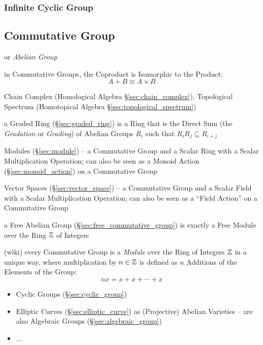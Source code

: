 \subsubsection{Infinite Cyclic Group}\label{sec:infinite_cyclic}



\subsection{Commutative Group}\label{sec:commutative_group}

or \emph{Abelian Group}

in Commutative Groups, the Coproduct is Isomorphic to the Product:
\[
  A + B \cong A \times B
\]

\fist Chain Complex (Homological Algebra \S\ref{sec:chain_complex}), Topological
Spectrum (Homotopical Algebra \S\ref{sec:topological_spectrum})

\fist a Graded Ring (\S\ref{sec:graded_ring}) is a Ring that is the Direct Sum
(the \emph{Gradation} or \emph{Grading}) of Abelian Groups $R_i$ such that
$R_iR_j \subseteq R_{i+j}$

\fist Modules (\S\ref{sec:module}) -- a Commutative Group and a Scalar Ring with
a Scalar Multiplication Operation; can also be seen as a Monoid Action
(\S\ref{sec:monoid_action}) on a Commutative Group

\fist Vector Spaces (\S\ref{sec:vector_space}) -- a Commutative Group and a
Scalar Field with a Scalar Multiplication Operation; can also be seen as a
``Field Action'' on a Commutative Group

\fist a Free Abelian Group (\S\ref{sec:free_commutative_group}) is exactly a
Free Module over the Ring $\mathbb{Z}$ of Integers

(wiki) every Commutative Group is a \emph{Module} over the Ring of Integers
$\mathbb{Z}$ in a unique way, where multiplication by $n \in \mathbb{Z}$ is defined as $n$
Additions of the Elements of the Group:
\[
  n x = x + x + \cdots + x
\]

\begin{itemize}
  \item Cyclic Groups (\S\ref{sec:cyclic_group})
  \item Elliptic Curves (\S\ref{sec:elliptic_curve}) as (Projective) Abelian
    Varieties -- are also Algebraic Groups (\S\ref{sec:algebraic_group})
  \item ...
\end{itemize}

